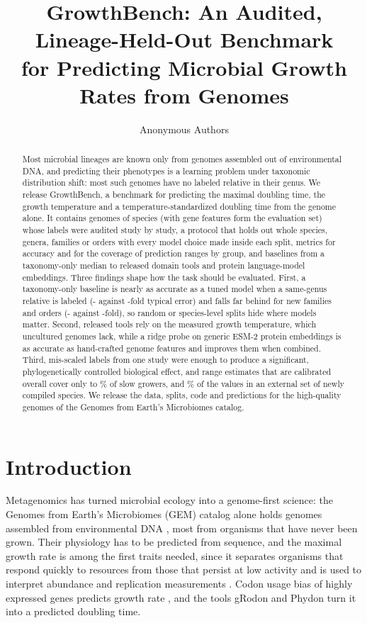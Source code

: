 \documentclass{article}
\title{GrowthBench: An Audited, Lineage-Held-Out Benchmark\\for Predicting Microbial Growth Rates from Genomes}
\author{Anonymous Authors}
\begin{document}
\maketitle

\begin{abstract}
Most microbial lineages are known only from genomes assembled out of environmental DNA, and predicting their phenotypes is
a learning problem under taxonomic distribution shift: most such genomes have no labeled relative in their genus. We
release GrowthBench, a benchmark for predicting the maximal doubling time, the growth temperature and a
temperature-standardized doubling time from the genome alone. It contains \NGenomes genomes of \NSpecies species (\NHeadlineRows with gene
features form the evaluation set) whose labels were audited study by study, a protocol that holds out whole species, genera, families or orders with every model choice
made inside each split, metrics for accuracy and for the coverage of prediction ranges by group, and baselines from a
taxonomy-only median to released domain tools and protein language-model embeddings. Three findings shape how the task
should be evaluated. First, a taxonomy-only baseline is nearly as accurate as a tuned model when a same-genus relative is
labeled (\BaseRelErrSameGenus- against \ErrSameGenus-fold typical error) and falls far behind for new families and orders
(\BaseRelErrNewOrder- against \ErrNewOrder-fold), so random or species-level splits hide where models matter. Second,
released tools rely on the measured growth temperature, which uncultured genomes lack, while a ridge probe on generic
ESM-2 protein embeddings is as accurate as hand-crafted genome features and improves them when combined. Third, \NExcludedKevbrinaWord
mis-scaled labels from one study were enough to produce a significant, phylogenetically controlled biological effect, and
range estimates that are calibrated overall cover only \CovDomSlowMin to \CovDomSlowMax\% of slow growers, and \ExtCoverage\%
of the values in an external set of \ExtN newly compiled species. We release the
data, splits, code and predictions for the \NGEMPredicted high-quality genomes of the Genomes from Earth's Microbiomes
catalog.
\end{abstract}

\section{Introduction}
Metagenomics has turned microbial ecology into a genome-first science: the Genomes from Earth's Microbiomes (GEM) catalog
alone holds \NGEMTotal genomes assembled from environmental DNA \citep{nayfach2021}, most from organisms that have never been
grown. Their physiology has to be predicted from sequence, and the maximal growth rate is among the first traits needed,
since it separates organisms that respond quickly to resources from those that persist at low activity and is used to
interpret abundance and replication measurements \citep{vieirasilva2010,roller2016,kirchman2016}. Codon usage bias of
highly expressed genes predicts growth rate \citep{vieirasilva2010}, and the tools gRodon \citep{weissman2021} and Phydon
\citep{xu2025} turn it into a predicted doubling time.
\end{document}
